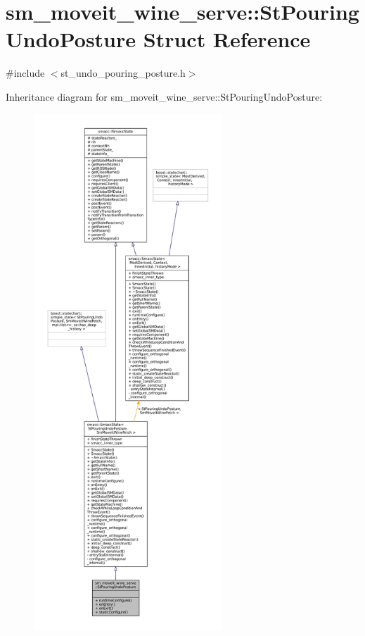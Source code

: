 \hypertarget{structsm__moveit__wine__serve_1_1StPouringUndoPosture}{}\section{sm\+\_\+moveit\+\_\+wine\+\_\+serve\+:\+:St\+Pouring\+Undo\+Posture Struct Reference}
\label{structsm__moveit__wine__serve_1_1StPouringUndoPosture}


{\ttfamily \#include $<$st\+\_\+undo\+\_\+pouring\+\_\+posture.\+h$>$}



Inheritance diagram for sm\+\_\+moveit\+\_\+wine\+\_\+serve\+:\+:St\+Pouring\+Undo\+Posture\+:
\nopagebreak
\begin{figure}[H]
\begin{center}
\leavevmode
\includegraphics[height=550pt]{structsm__moveit__wine__serve_1_1StPouringUndoPosture__inherit__graph}
\end{center}
\end{figure}


